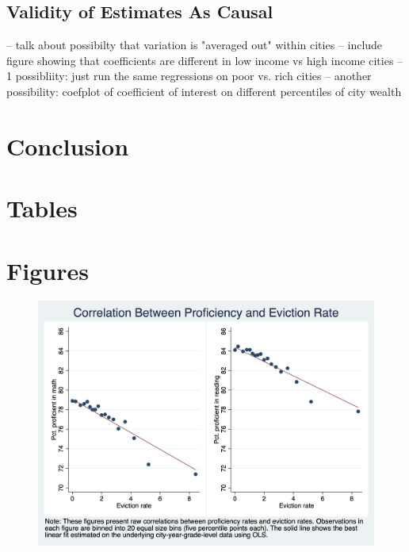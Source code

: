 \documentclass[12pt]{article}
\begin{document}
\subsection{Validity of Estimates As Causal}



-- talk about possibilty that variation is "averaged out" within cities
    -- include figure showing that coefficients are different in low income vs high income cities
    -- 1 possibliity: just run the same regressions on poor vs. rich cities
    -- another possibility: coefplot of coefficient of interest on different percentiles of city wealth
\section{Conclusion} \label{sec:conclusion}



\singlespacing
\setlength\bibsep{0pt}





\clearpage

\onehalfspacing

\section*{Tables} \label{sec:tab}
\begin{landscape}

\end{landscape}







\clearpage

\section*{Figures} \label{sec:fig}

\begin{figure}[H]
    \centering
    \includegraphics[scale=0.45]{output/graphs/outcome_binscatter.png}
    \caption{}
    \label{fig:my_label}
\end{figure}
\end{document}
